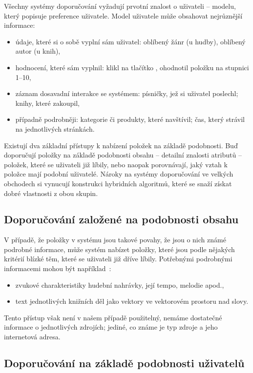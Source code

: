 Všechny systémy doporučování vyžadují prvotní znalost o uživateli -- modelu, který popisuje preference uživatele.
Model uživatele může obsahovat nejrůznější informace:
\begin{itemize}
    \item údaje, které si o sobě vyplní sám uživatel: oblíbený žánr (u hudby), oblíbený autor (u knih),
    \item hodnocení, které sám vyplnil: klikl na tlačítko , ohodnotil položku na stupnici 1--10,
    \item záznam dosavadní interakce se systémem: písničky, jež si uživatel poslechl; knihy, které zakoupil,
	\item případně podrobněji: kategorie či produkty, které navštívil; čas, který strávil na jednotlivých stránkách.
\end{itemize}

Existují dva základní přístupy k nabízení položek na základě podobnosti.
Buď doporučují položky na základě podobnosti obsahu -- detailní znalosti atributů -- položek, které se uživateli již líbily,
nebo naopak porovnávají, jaký vztah k položce mají podobní uživatelé.
Nároky na systémy doporučování ve velkých obchodech si vynucují konstrukci hybridních algoritmů, které se snaží získat dobré vlastnosti z obou skupin.

\subsection{Doporučování založené na podobnosti obsahu}

V případě, že položky v systému jsou takové povahy, že jsou o nich známé podrobné informace, může systém nabízet položky, které jsou podle nějakých kritérií blízké těm, které se uživateli již dříve líbily.
Potřebnými podrobnými informacemi mohou být například~\cite{pazzani2007content}:
\begin{itemize}
    \item zvukové charakteristiky hudební nahrávky, její tempo, melodie apod.,
    \item text jednotlivých knižních děl jako vektory ve vektorovém prostoru nad slovy.
\end{itemize}

Tento přístup však není v našem případě použitelný, nemáme dostatečné informace o jednotlivých zdrojích; jediné, co známe je typ zdroje a jeho internetová adresa.

\subsection{Doporučování na základě podobnosti uživatelů}

